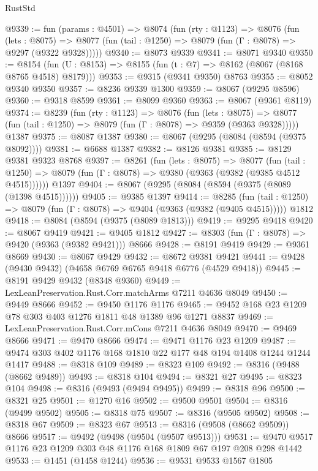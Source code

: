 \begin{lexlean}{RustStd}
\begin{coremodule}
@9339 := fun (params : @4501) =>
  @8074
    (fun (rty : @1123) =>
    @8076
      (fun (lets : @8075) =>
      @8077 (fun (tail : @1250) => @8079 (fun (Γ : @8078) => @9297 (@9322 @9328)))))
@9340 := @8073 @9339
@9341 := @8071 @9340
@9350 := @8154 (fun (U : @8153) => @8155 (fun (t : @7) => @8162 (@8067 (@8168 @8765 @4518) @8179)))
@9353 := @9315 (@9341 @9350) @8763
@9355 := @8052 @9340 @9350
@9357 := @8236 @9339 @1300
@9359 := @8067 (@9295 @8596)
@9360 := @9318 @8599
@9361 := @8099 @9360
@9363 := @8067 (@9361 @8119)
@9374 := @8239
    (fun (rty : @1123) =>
    @8076
      (fun (lets : @8075) =>
      @8077 (fun (tail : @1250) => @8079 (fun (Γ : @8078) => @9359 (@9363 @9328)))))
    @1387
@9375 := @8087 @1387
@9380 := @8067 (@9295 (@8084 (@8594 (@9375 @8092))))
@9381 := @6688 @1387
@9382 := @8126 @9381
@9385 := @8129 @9381 @9323 @8768
@9397 := @8261
    (fun (lets : @8075) =>
    @8077
      (fun (tail : @1250) => @8079 (fun (Γ : @8078) => @9380 (@9363 (@9382 (@9385 @4512 @4515))))))
    @1397
@9404 := @8067 (@9295 (@8084 (@8594 (@9375 (@8089 (@1398 @4515))))))
@9405 := @9385 @1397
@9414 := @8285
    (fun (tail : @1250) => @8079 (fun (Γ : @8078) => @9404 (@9363 (@9382 (@9405 @4515)))))
    @1812
@9418 := @8084 (@8594 (@9375 (@8089 @1813)))
@9419 := @9295 @9418
@9420 := @8067 @9419
@9421 := @9405 @1812
@9427 := @8303 (fun (Γ : @8078) => @9420 (@9363 (@9382 @9421))) @8666
@9428 := @8191 @9419
@9429 := @9361 @8669
@9430 := @8067 @9429
@9432 := @8672 @9381 @9421
@9441 := @9428 (@9430 @9432) (@4658 @6769 @6765 @9418 @6776 (@4529 @9418))
@9445 := @8191 @9429 @9432 (@8348 @9360)
@9449 := LexLeanPreservation.Rust.Corr.matchArms @7211 @4636 @8049
@9450 := @9449 @8666
@9452 := @9450 @1176 @1176
@9465 := @9452 @168 @23 @1209 @78 @303 @403 @1276 @1811 @48 @1389 @96 @1271 @8837
@9469 := LexLeanPreservation.Rust.Corr.mCons @7211 @4636 @8049
@9470 := @9469 @8666
@9471 := @9470 @8666
@9474 := @9471 @1176 @23 @1209
@9487 := @9474 @303 @402 @1176 @168 @1810 @22 @177 @48 @194 @1408 @1244 @1244 @1417
@9488 := @8318 @109
@9489 := @8323 @109
@9492 := @8316 (@9488 (@8662 @9489))
@9493 := @8318 @104
@9494 := @8321 @27
@9495 := @8323 @104
@9498 := @8316 (@9493 (@9494 @9495))
@9499 := @8318 @96
@9500 := @8321 @25
@9501 := @1270 @16
@9502 := @9500 @9501
@9504 := @8316 (@9499 @9502)
@9505 := @8318 @75
@9507 := @8316 (@9505 @9502)
@9508 := @8318 @67
@9509 := @8323 @67
@9513 := @8316 (@9508 (@8662 @9509)) @8666
@9517 := @9492 (@9498 (@9504 (@9507 @9513)))
@9531 := @9470 @9517 @1176 @23 @1209 @303 @48 @1176 @168 @1809 @67 @197 @208 @298 @1442
@9533 := @1451 (@1458 @1244)
@9536 := @9531 @9533 @1567 @1805

\end{coremodule}
\end{lexlean}
